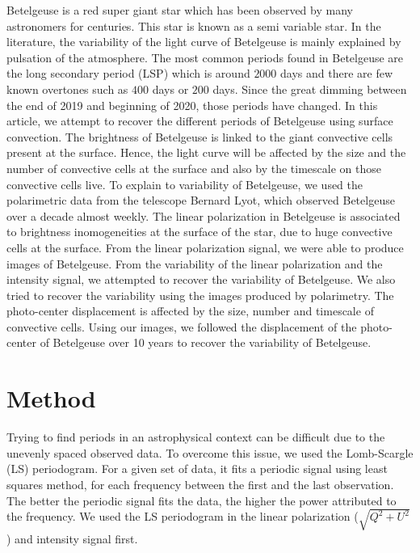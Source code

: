 \documentclass{aa}
\begin{document}
Betelgeuse is a red super giant star which has been observed by many astronomers for centuries. This star is known as a 
semi variable star. In the literature, the variability of the light curve of Betelgeuse is mainly explained by pulsation of 
the atmosphere. The most common periods found in Betelgeuse are the long secondary period (LSP) which is around $2000$ days 
and there are few known overtones such as $400$ days or $200$ days. Since the great dimming between the end of 2019 and 
beginning of 2020, those periods have changed. In this article, we attempt to recover the different periods of Betelgeuse 
using surface convection. The brightness of Betelgeuse is linked to the giant convective cells present at the surface. Hence, 
the light curve will be affected by the size and the number of convective cells at the surface and also by the timescale on 
those convective cells live. To explain to variability of Betelgeuse, we used the polarimetric data from the telescope Bernard 
Lyot, which observed Betelgeuse over a decade almost weekly. The linear polarization in Betelgeuse is associated to brightness 
inomogeneities at the surface of the star, due to huge convective cells at the surface. From the linear polarization signal, 
we were able to produce images of Betelgeuse. From the variability of the linear polarization and the intensity signal, we 
attempted to recover the variability of Betelgeuse. We also tried to recover the variability using the images produced by 
polarimetry. The photo-center displacement is affected by the size, number and timescale of convective cells. Using our 
images, we followed the displacement of the photo-center of Betelgeuse over 10 years to recover the variability of 
Betelgeuse. 

\section{Method}

Trying to find periods in an astrophysical context can be difficult due to the unevenly spaced observed data. To overcome this issue, we used the Lomb-Scargle (LS) periodogram. For a given set of data, it fits a periodic signal using least squares method, for each frequency between the first and the last observation. The better the periodic signal fits the data, the higher the power attributed to the frequency. We used the LS periodogram in the linear polarization ($\sqrt{Q^2+U^2}$) and intensity signal first. 
\end{document}
